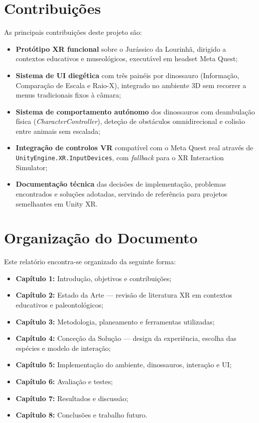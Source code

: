\documentclass[a4paper,11pt]{report}
\newcommand{\code}[1]{\texttt{#1}}
\begin{document}
\section{Contribuições}

As principais contribuições deste projeto são:

\begin{itemize}
    \setlength\itemsep{0pt}
    \item \textbf{Protótipo XR funcional} sobre o Jurássico da Lourinhã,
          dirigido a contextos educativos e museológicos, executável em
          headset Meta Quest;
    \item \textbf{Sistema de UI diegética} com três painéis por dinossauro
          (Informação, Comparação de Escala e Raio-X), integrado no ambiente
          3D sem recorrer a menus tradicionais fixos à câmara;
    \item \textbf{Sistema de comportamento autónomo} dos dinossauros com
          deambulação física (\textit{CharacterController}), deteção de
          obstáculos omnidirecional e colisão entre animais sem escalada;
    \item \textbf{Integração de controlos VR} compatível com o Meta Quest
          real através de \code{UnityEngine.XR.InputDevices}, com
          \textit{fallback} para o XR Interaction Simulator;
    \item \textbf{Documentação técnica} das decisões de implementação,
          problemas encontrados e soluções adotadas, servindo de referência
          para projetos semelhantes em Unity XR.
\end{itemize}

\section{Organização do Documento}

Este relatório encontra-se organizado da seguinte forma:

\begin{itemize}
    \setlength\itemsep{0pt}
    \item \textbf{Capítulo 1:} Introdução, objetivos e contribuições;
    \item \textbf{Capítulo 2:} Estado da Arte --- revisão de literatura XR
          em contextos educativos e paleontológicos;
    \item \textbf{Capítulo 3:} Metodologia, planeamento e ferramentas
          utilizadas;
    \item \textbf{Capítulo 4:} Conceção da Solução --- design da experiência,
          escolha das espécies e modelo de interação;
    \item \textbf{Capítulo 5:} Implementação do ambiente, dinossauros,
          interação e UI;
    \item \textbf{Capítulo 6:} Avaliação e testes;
    \item \textbf{Capítulo 7:} Resultados e discussão;
    \item \textbf{Capítulo 8:} Conclusões e trabalho futuro.
\end{itemize}
\end{document}
